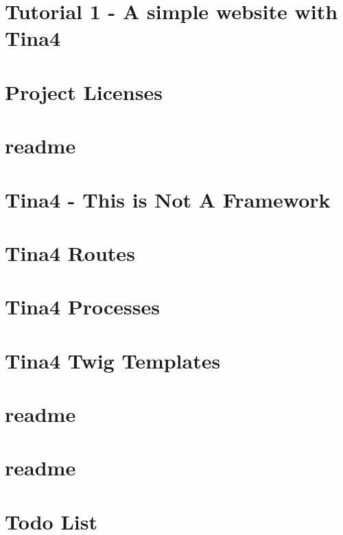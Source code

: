 \let\mypdfximage\pdfximage\def\pdfximage{\immediate\mypdfximage}\documentclass[twoside]{book}
\newcommand{\+}{\discretionary{\mbox{\scriptsize$\hookleftarrow$}}{}{}}
\begin{document}
\chapter{Tutorial 1 -\/ A simple website with Tina4}
\label{md_docs_tutorials}

\chapter{Project Licenses}
\label{md_licenses}

\chapter{readme}
\label{md_objects_readme}

\chapter{Tina4 -\/ This is Not A Framework}
\label{md_readme}

\chapter{Tina4 Routes}
\label{md_routes_readme}

\chapter{Tina4 Processes}
\label{md_services_readme}

\chapter{Tina4 Twig Templates}
\label{md_templates_readme}

\chapter{readme}
\label{md_tests_tests_acceptance_readme}

\chapter{readme}
\label{md_tests_tests_functional_readme}

\chapter{Todo List}
\label{todo}

\end{document}

